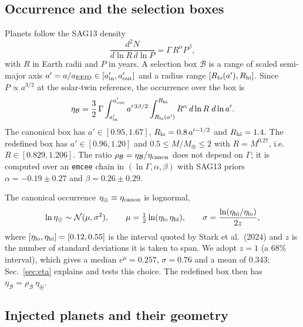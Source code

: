 \documentclass[11pt,a4paper]{article}
\begin{document}
\subsection{Occurrence and the selection boxes}

Planets follow the SAG13 density
\begin{equation}
\frac{d^2N}{d\ln R\,d\ln P} = \Gamma\,R^{\alpha}P^{\beta},
\label{eq:sag13}
\end{equation}
with $R$ in Earth radii and $P$ in years. A selection box $\mathcal{B}$ is a range of scaled
semi-major axis $a' = a/a_{\rm EEID} \in [a'_{\rm in}, a'_{\rm out}]$ and a radius range
$[R_{\rm lo}(a'), R_{\rm hi}]$. Since $P \propto a^{3/2}$ at the solar-twin reference, the
occurrence over the box is
\begin{equation}
\eta_\mathcal{B} = \frac{3}{2}\,\Gamma\int_{a'_{\rm in}}^{a'_{\rm out}} a'^{\,3\beta/2}
\int_{R_{\rm lo}(a')}^{R_{\rm hi}} R^{\alpha}\,d\ln R\;d\ln a'.
\label{eq:etabox}
\end{equation}
The canonical box has $a' \in [0.95, 1.67]$, $R_{\rm lo} = 0.8\,a'^{-1/2}$ and $R_{\rm hi} = 1.4$.
The redefined box has $a' \in [0.96, 1.20]$ and $0.5 \le M/M_\oplus \le 2$ with $R = M^{0.27}$,
i.e.\ $R \in [0.829, 1.206]$. The ratio $\rho_\mathcal{B} = \eta_\mathcal{B}/\eta_{\rm canon}$
does not depend on $\Gamma$; it is computed over an \texttt{emcee} chain in
$(\ln\Gamma, \alpha, \beta)$ with SAG13 priors $\alpha = -0.19 \pm 0.27$ and
$\beta = 0.26 \pm 0.29$.

The canonical occurrence $\eta_\oplus \equiv \eta_{\rm canon}$ is lognormal,
\begin{equation}
\ln\eta_\oplus \sim \mathcal{N}(\mu, \sigma^2), \qquad
\mu = \tfrac{1}{2}\ln(\eta_{\rm lo}\,\eta_{\rm hi}), \qquad
\sigma = \frac{\ln(\eta_{\rm hi}/\eta_{\rm lo})}{2z},
\label{eq:etalaw}
\end{equation}
where $[\eta_{\rm lo}, \eta_{\rm hi}] = [0.12, 0.55]$ is the interval quoted by Stark et al.\
(2024) and $z$ is the number of standard deviations it is taken to span. We adopt $z = 1$
(a 68\% interval), which gives a median $e^{\mu} = 0.257$, $\sigma = 0.76$ and a mean of
0.343; Sec.~\ref{sec:eta} explains and tests this choice. The redefined box then has
$\eta_\mathcal{B} = \rho_\mathcal{B}\,\eta_\oplus$.

\subsection{Injected planets and their geometry}
\end{document}
